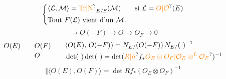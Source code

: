 \[
\left\{\begin{aligned}
&\langle\mathcal L,\mathcal M\rangle=\unsure{\mathrm{Tr}|\mathrm N}_{E/S}(\mathcal M)\qquad\text{si }\mathcal L=\unsure{O|\mathcal O}(E)\\
&\text{Tout }F(\mathcal L)\text{ vient d'un }\mathcal M.
\end{aligned}\right.
\]
\[
\longrightarrow O(-F)\longrightarrow O\longrightarrow O_F\longrightarrow0
\]
\[
\begin{aligned}
O(E)\qquad &O(F)\\[-1pt]
&O
\end{aligned}
\qquad
\begin{aligned}
&\langle O(E),\,O(-F))=N_{E/}(O(-F))\,N_{E/}(\ )^{-1}\\
&\det(\ )\det(\ )=\det(\unsure{R|h}f_*\unsure{O_E\otimes O_F|\mathcal O_E\otimes^{L}\mathcal O_F})^{-1}
\end{aligned}
\]
\[
\Big\Vert\langle O(E),O(F)\rangle=\det Rf_*(O_E\otimes O_F)^{-1}
\]


